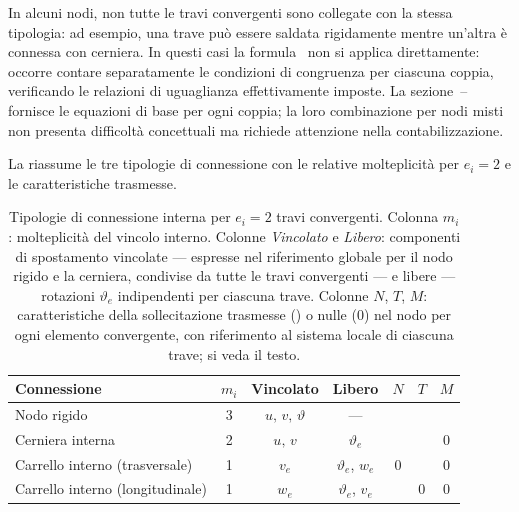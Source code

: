 \begin{oss}
	In alcuni nodi, non tutte le travi convergenti sono
	collegate con la stessa tipologia: ad esempio, una trave
	può essere saldata rigidamente mentre un'altra è
	connessa con cerniera. In questi casi la
	formula~ non si applica
	direttamente: occorre contare separatamente le condizioni
	di congruenza per ciascuna coppia, verificando le
	relazioni di uguaglianza effettivamente imposte.
	La sezione~--
	fornisce le equazioni di base per ogni coppia; la loro
	combinazione per nodi misti non presenta difficoltà
	concettuali ma richiede attenzione nella contabilizzazione.
\end{oss}

La  riassume le tre tipologie
di connessione con le relative molteplicità per $e_i = 2$
e le caratteristiche trasmesse.

\begin{table}[htbp]
	\centering
	\renewcommand{\arraystretch}{1.6}
	\begin{tabular}{lcccccc}
		\toprule
		\textbf{Connessione} & $m_i$ & \textbf{Vincolato} &
		\textbf{Libero} & $N$ & $T$ & $M$ \\
		\midrule
		Nodo rigido      & 3 & $u,\,v,\,\vartheta$ & --- &
		\checkmark & \checkmark & \checkmark \\
		Cerniera interna & 2 & $u,\,v$ & $\vartheta_e$ &
		\checkmark & \checkmark & $0$ \\
		Carrello interno (trasversale) & 1 & $v_e$ & $\vartheta_e$, $w_e$ &
		$0$ & \checkmark & $0$ \\
		Carrello interno (longitudinale) & 1 & $w_e$ & $\vartheta_e$, $v_e$ &
		\checkmark & $0$ & $0$ \\
		\bottomrule
	\end{tabular}
	\caption{Tipologie di connessione interna per $e_i = 2$
		travi convergenti. Colonna $m_i$: molteplicità
		del vincolo interno. Colonne \emph{Vincolato}
		e \emph{Libero}: componenti di spostamento
		vincolate --- espresse nel riferimento globale per il nodo rigido e la cerniera,
		condivise da tutte le travi convergenti --- e
		libere --- rotazioni $\vartheta_e$ indipendenti
		per ciascuna trave. Colonne $N$, $T$, $M$:
		caratteristiche della sollecitazione trasmesse
		(\checkmark) o nulle ($0$) nel nodo per ogni
		elemento convergente, con riferimento al sistema
		locale di ciascuna trave; si veda il testo.}
	\label{tab:connessioni}
\end{table}

